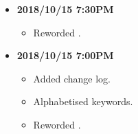 \documentclass[../gazprea.tex]{subfiles}
\begin{document}
\begin{itemize}
  \item
    \textbf{2018/10/15 7:30PM}
    \begin{itemize}
      \item Reworded .
    \end{itemize}
  \item
    \textbf{2018/10/15 7:00PM}
    \begin{itemize}
      \item Added change log.
      \item Alphabetised keywords.
      \item Reworded .
    \end{itemize}
\end{itemize}
\end{document}
